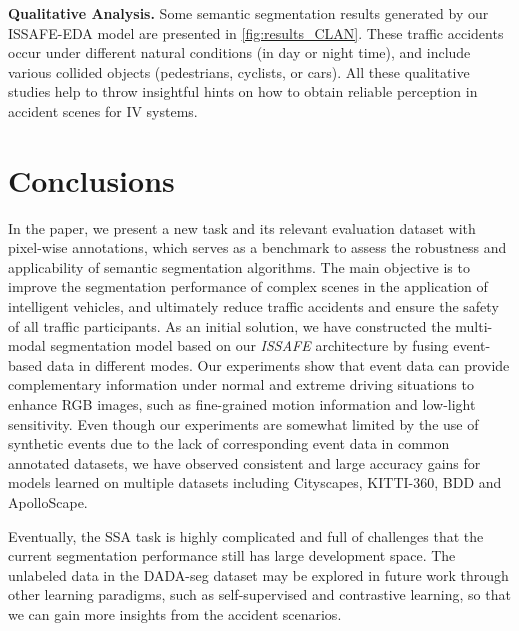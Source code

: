 \documentclass[letterpaper, 10 pt, conference]{ieeeconf}
\begin{document}
\textbf{Qualitative Analysis.} Some semantic segmentation results generated by our ISSAFE-EDA model are presented in \cref{fig:results_CLAN}. These traffic accidents occur under different natural conditions (in day or night time), and include various collided objects (pedestrians, cyclists, or cars). All these qualitative studies help to throw insightful hints on how to obtain reliable perception in accident scenes for IV systems.

\section{Conclusions}
In the paper, we present a new task and its relevant evaluation dataset with pixel-wise annotations, which serves as a benchmark to assess the robustness and applicability of semantic segmentation algorithms. The main objective is to improve the segmentation performance of complex scenes in the application of intelligent vehicles, and ultimately reduce traffic accidents and ensure the safety of all traffic participants.
As an initial solution, we have constructed the multi-modal segmentation model based on our \textit{ISSAFE} architecture by fusing event-based data in different modes. Our experiments show that event data can provide complementary information under normal and extreme driving situations to enhance RGB images, such as fine-grained motion information and low-light sensitivity. Even though our experiments are somewhat limited by the use of synthetic events due to the lack of corresponding event data in common annotated datasets, we have observed consistent and large accuracy gains for models learned on multiple datasets including Cityscapes, KITTI-360, BDD and ApolloScape. 


Eventually, the SSA task is highly complicated and full of challenges that the current segmentation performance still has large development space. The unlabeled data in the DADA-seg dataset may be explored in future work through other learning paradigms, such as self-supervised and contrastive learning, so that we can gain more insights from the accident scenarios.



\end{document}
